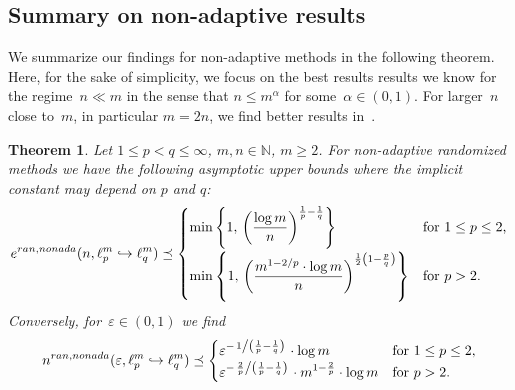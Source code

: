 \documentclass[12pt]{article}
\theoremstyle{plain}
\newtheorem{theorem}{Theorem}[section]
\theoremstyle{definition}
\newcommand{\ran}{\textup{ran}}
\newcommand{\nonada}{\textup{nonada}}
\newcommand{\eps}{\varepsilon}
\newcommand{\embed}{\hookrightarrow}
\newcommand{\N}{{\mathbb N}}
\begin{document}
\subsection{Summary on non-adaptive results}
\label{sec:nonadasummary}

We summarize our findings for non-adaptive methods in the following theorem.
Here, for the sake of simplicity,
we focus on the best results results we know for the regime~$n \ll m$ in the sense that $n \leq m^\alpha$ for some~$\alpha \in (0,1)$.
For larger~$n$ close to~$m$, in particular $m=2n$, we find better results in~\cite[Sec~4]{H92}.

\begin{theorem} \label{thm:nonada-summary}
    Let $1 \leq p < q \leq \infty$, $m,n \in \N$, $m \geq 2$.
    For non-adaptive randomized methods we have the following asymptotic upper bounds where the implicit constant may depend on $p$ and $q$:
    \begin{equation*}
        e^{\ran,\nonada}(n,\ell_p^m \embed \ell_q^m)
            \preceq
                \begin{cases}
                    \displaystyle
                    \min\left\{1,\, \left(\frac{\log m}{n}\right)^{\frac{1}{p} - \frac{1}{q}}
                        \right\}
                        &\text{for $1 \leq p \leq 2$,} \vspace{2pt}\\
                    \displaystyle
                    \min\left\{1,\,
                                \left( \frac{m^{1-2/p} \cdot \log m}{n}\right)^{\frac{1}{2}\left(1 - \frac{p}{q}\right)}
                                \right\}
                        &\text{for $p > 2$.}
                \end{cases}
    \end{equation*}
    Conversely, for~$\eps \in (0,1)$ we find
    \begin{equation*}
        n^{\ran,\nonada}(\eps,\ell_p^m \embed \ell_q^m)
            \preceq \begin{cases}
                \eps^{-\left. 1 \middle/\left(\frac{1}{p} - \frac{1}{q}\right)\right.}
                    \cdot \log m
                    &\text{for } 1 \leq p \leq 2,\\
                \eps^{-\left. \frac{2}{p}\middle/\left(\frac{1}{p} - \frac{1}{q}\right)\right.}
                        \cdot m^{1 - \frac{2}{p}} \cdot  \log m
                    &\text{for } p > 2.
            \end{cases}
    \end{equation*}
\end{theorem}
\end{document}
